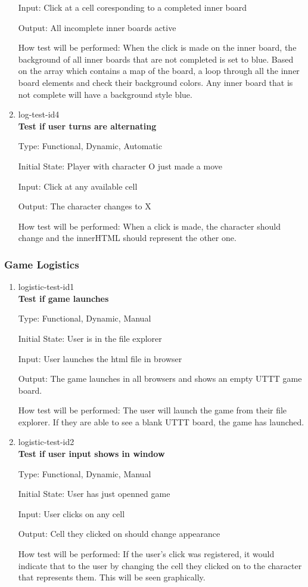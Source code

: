 \documentclass[12pt, titlepage]{article}
\begin{document}
\begin{enumerate}
Input: Click at a cell coresponding to a completed inner board
					
Output: All incomplete inner boards active
					
How test will be performed: When the click is made on the inner board, the background of all inner boards that are not completed is set to blue. Based on the array which contains a map of the board, a loop through all the inner board elements and check their background colors. Any inner board that is not complete will have a background style blue.

\item{log-test-id4\\}
\textbf{Test if user turns are alternating}

Type: Functional, Dynamic, Automatic
					
Initial State: Player with character O just made a move

Input: Click at any available cell
					
Output: The character changes to X
					
How test will be performed: When a click is made, the character should change and the innerHTML should represent the other one.

\end{enumerate}

\subsubsection{Game Logistics}

\begin{enumerate}

\item{logistic-test-id1\\}
\textbf{Test if game launches}

Type: Functional, Dynamic, Manual
					
Initial State: User is in the file explorer
					
Input: User launches the html file in browser
					
Output: The game launches in all browsers and shows an empty UTTT game board. 
					
How test will be performed: The user will launch the game from their file explorer. If they are able to see a blank UTTT board, the game has launched.

\item{logistic-test-id2\\}
\textbf{Test if user input shows in window}

Type: Functional, Dynamic, Manual
					
Initial State: User has just openned game
					
Input: User clicks on any cell
					
Output: Cell they clicked on should change appearance
					
How test will be performed: If the user's click was registered, it would indicate that to the user by changing the cell they clicked on to the character that represents them. This will be seen graphically.

\end{enumerate}
\end{document}
